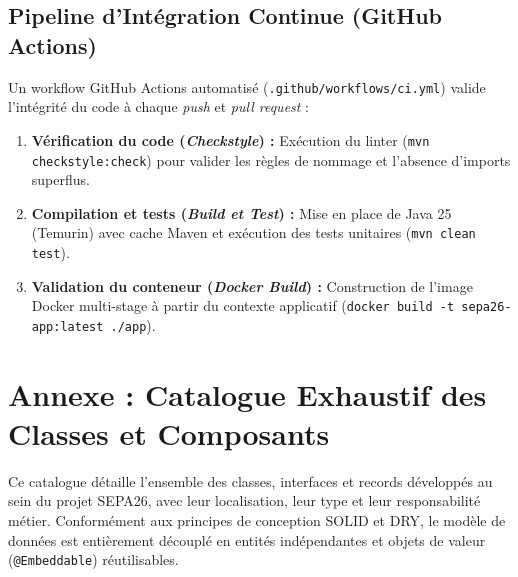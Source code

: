 \documentclass[12pt,a4paper]{article}
\begin{document}
\subsection{Pipeline d'Intégration Continue (GitHub Actions)}

Un workflow GitHub Actions automatisé (\texttt{.github/workflows/ci.yml}) valide l'intégrité du code à chaque \textit{push} et \textit{pull request} :
\begin{enumerate}[leftmargin=*]
    \item \textbf{Vérification du code (\textit{Checkstyle}) :} Exécution du linter (\texttt{mvn checkstyle:check}) pour valider les règles de nommage et l'absence d'imports superflus.
    \item \textbf{Compilation et tests (\textit{Build et Test}) :} Mise en place de Java 25 (Temurin) avec cache Maven et exécution des tests unitaires (\texttt{mvn clean test}).
    \item \textbf{Validation du conteneur (\textit{Docker Build}) :} Construction de l'image Docker multi-stage à partir du contexte applicatif (\texttt{docker build -t sepa26-app:latest ./app}).
\end{enumerate}

\newpage

\appendix
\section{Annexe : Catalogue Exhaustif des Classes et Composants}

Ce catalogue détaille l'ensemble des classes, interfaces et records développés au sein du projet SEPA26, avec leur localisation, leur type et leur responsabilité métier. Conformément aux principes de conception SOLID et DRY, le modèle de données est entièrement découplé en entités indépendantes et objets de valeur (\texttt{@Embeddable}) réutilisables.

\small
\setlength{\tabcolsep}{6pt}
\renewcommand{\arraystretch}{1.25}
\end{document}
